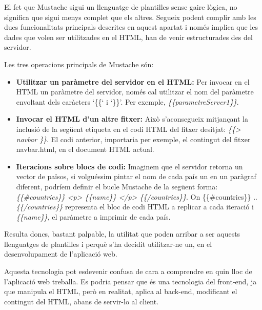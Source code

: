     El fet que Mustache sigui un llenguatge de plantilles sense gaire lògica, no significa que sigui menys complet que els altres. Segueix podent complir amb les dues funcionalitats principals descrites en aquest apartat i només implica que les dades que volen ser utilitzades en el HTML, han de venir estructurades des del servidor.

    Les tres operacions principals de Mustache són:

    \begin{itemize}
        \item \textbf{Utilitzar un paràmetre del servidor en el HTML:} Per invocar en el HTML un paràmetre del servidor, només cal utilitzar el nom del paràmetre envoltant dels caràcters `\{\{‘ i `\}\}’. Per exemple, \emph{\{\{parametreServer1\}\}}.
        \item \textbf{Invocar el HTML d'un altre fitxer:} Això s'aconsegueix mitjançant la inclusió de la següent etiqueta en el codi HTML del fitxer desitjat: \emph{\{\{> navbar \}\}}. El codi anterior, importaria per exemple, el contingut del fitxer navbar.html, en el document HTML actual.
        \item \textbf{Iteracions sobre blocs de codi:} Imaginem que el servidor retorna un vector de països, si volguéssim pintar el nom de cada país un en un paràgraf diferent, podríem definir el bucle Mustache de la següent forma: \emph{\{\{\#countries\}\} <p> \{\{name\}\} </p> \{\{/countries\}\}}. On \{\{\#countries\}\} .. \emph{\{\{/countries\}\}} representa el bloc de codi HTML a replicar a cada iteració i \emph{\{\{name\}\}}, el paràmetre a imprimir de cada país.
    \end{itemize}

    Resulta doncs, bastant palpable, la utilitat que poden arribar a ser aquests llenguatges de plantilles i perquè s'ha decidit utilitzar-ne un, en el desenvolupament de l'aplicació web.

    Aquesta tecnologia pot esdevenir confusa de cara a comprendre en quin lloc de l’aplicació web treballa. Es podria pensar que és una tecnologia del front-end, ja que manipula el HTML, però en realitat, aplica al back-end, modificant el contingut del HTML, abans de servir-lo al client.
